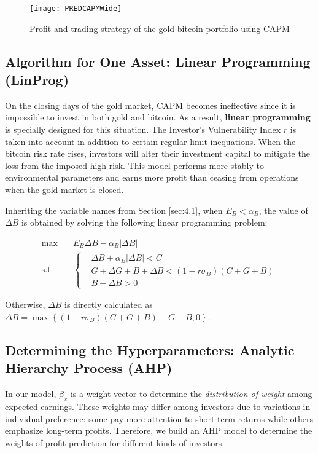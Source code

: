 \documentclass{mcmthesis}
\begin{document}
{	\begin{figure}[h]
		\label{fig:13}
		\centering \texttt{[image: PREDCAPMWide]}
		\caption{Profit and trading strategy of the gold-bitcoin portfolio using CAPM}
	\end{figure}
	
	\subsection{Algorithm for One Asset: Linear Programming (LinProg)}
	\label{sec:4.2}
	
	On the closing days of the gold market, CAPM becomes ineffective since it is impossible to invest in both gold and bitcoin. As a result, \textbf{linear programming} is specially designed for this situation. The Investor's Vulnerability Index $r$ is taken into account in addition to certain regular limit inequations. When the bitcoin risk rate rises, investors will alter their investment capital to mitigate the loss from the imposed high risk. This model performs more stably to environmental parameters and earns more profit than ceasing from operations when the gold market is closed. 
	
	Inheriting the variable names from Section \ref{sec:4.1}, when $E_B < \alpha_B$, the value of $\Delta B$ is obtained by solving the following linear programming problem: 
	
	$$
	\begin{aligned}
		\max \quad & E_B \Delta B - \alpha_B |\Delta B| \\
		\textrm{s.t.} \quad & \left\{
		\begin{aligned}
			& \Delta B + \alpha_B |\Delta B| < C \\
			& G + \Delta G + B + \Delta B < \left(1-r\sigma_B\right) \left(C+G+B\right) \\
			& B + \Delta B > 0
		\end{aligned}
		\right.
	\end{aligned}
	$$
	
	Otherwise, $\Delta B$ is directly calculated as $\Delta B = \max \left\{ \left( 1-r\sigma_B \right) \left(C+G+B\right) - G - B, 0 \right\}$. 
	
	\subsection{Determining the Hyperparameters: Analytic Hierarchy Process (AHP)}
	\label{sec:4.3}
	
	In our model, $\beta_x$ is a weight vector to determine the \textit{distribution of weight} among expected earnings. These weights may differ among investors due to variations in individual preference: some pay more attention to short-term returns while others emphasize long-term profits. Therefore, we build an AHP model to determine the weights of profit prediction for different kinds of investors. 
	
}
\end{document}
